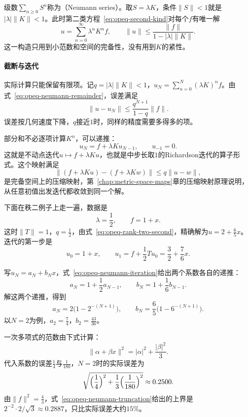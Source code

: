 级数$\sum_{n\geq0}S^n$称为（Neumann series）。取$S=\lambda K$，条件$\lVert S\rVert<1$就是$\lvert\lambda\rvert\lVert K\rVert<1$。此时第二类方程~\eqref{eq:opeq-second-kind}对每个$f$有唯一解
\begin{equation}
  u=\sum_{n=0}^\infty\lambda^nK^nf,\qquad
  \lVert u\rVert\leq\frac{\lVert f\rVert}{1-\lvert\lambda\rvert\lVert K\rVert}.
  \label{eq:opeq-neumann-solution}
\end{equation}
这一构造只用到小范数和空间的完备性，没有用到$K$的紧性。

\paragraph{截断与迭代}
实际计算只能保留有限项。记$q=\lvert\lambda\rvert\lVert K\rVert<1$，$u_N=\sum_{n=0}^{N}(\lambda K)^nf$。由式~\eqref{eq:opeq-neumann-remainder}，误差满足
\begin{equation}
  \lVert u-u_N\rVert\leq\frac{q^{N+1}}{1-q}\lVert f\rVert.
  \label{eq:opeq-neumann-truncation}
\end{equation}
误差按几何速度下降，$q$接近$1$时，同样的精度需要多得多的项。

部分和不必逐项计算$K^n$，可以递推：
\begin{equation}
  u_N=f+\lambda Ku_{N-1},\qquad u_{-1}=0.
  \label{eq:opeq-neumann-iteration}
\end{equation}
这就是不动点迭代$u\mapsto f+\lambda Ku$，也就是中步长取$1$的Richardson迭代的算子形式。这个映射满足
\[
  \lVert(f+\lambda Ku)-(f+\lambda Kw)\rVert\leq q\lVert u-w\rVert,
\]
是完备空间上的压缩映射，第~\ref{chap:metric-space-maps}章的压缩映射原理说明，从任意初值出发迭代都收敛到同一个解。

下面在秩二例子上走一遍，数据是
\[
  \lambda=\frac12,\qquad f=1+x.
\]
这时$\lVert T\rVert=1$，$q=\frac12$，由式~\eqref{eq:opeq-rank-two-second}，精确解为$u=2+\frac65x$。迭代的第一步是
\[
  u_0=1+x,\qquad
  u_1=f+\frac12Tu_0=\frac32+\frac76x.
\]

写$u_N=a_N+b_Nx$，式~\eqref{eq:opeq-neumann-iteration}给出两个系数各自的递推：
\[
  a_N=1+\frac12a_{N-1},\qquad b_N=1+\frac16b_{N-1}.
\]
解这两个递推，得到
\[
  a_N=2\bigl(1-2^{-(N+1)}\bigr),\qquad
  b_N=\frac65\bigl(1-6^{-(N+1)}\bigr).
\]
以$N=2$为例，$a_2=\frac74$，$b_2=\frac{43}{36}$。

一次多项式的范数由下式计算：
\[
  \lVert\alpha+\beta x\rVert^2=\lvert\alpha\rvert^2+\frac{\lvert\beta\rvert^2}3.
\]
代入系数的误差$\frac14$与$\frac1{180}$，$N=2$时的实际误差为
\[
  \sqrt{\Bigl(\frac14\Bigr)^2+\frac13\Bigl(\frac1{180}\Bigr)^2}\approx0.2500.
\]
由$\lVert f\rVert^2=\frac43$，式~\eqref{eq:opeq-neumann-truncation}给出的上界是$2^{-2}\cdot2/\sqrt3\approx0.2887$，只比实际误差大约$15\%$。

